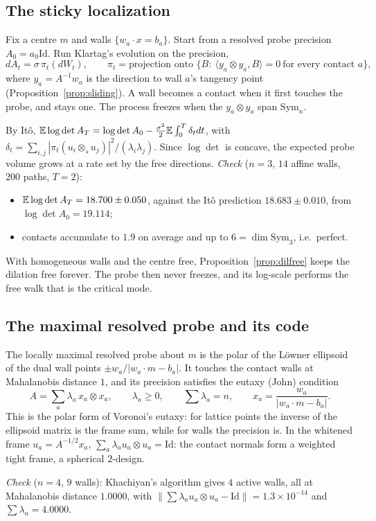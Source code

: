 \label{sec:process}
\subsection{The sticky localization}
\begin{definition}
Fix a centre $m$ and walls $\{w_a\cdot x=b_a\}$. Start from a resolved probe precision $A_0=a_0\mathrm{Id}$. Run Klartag's evolution on the precision,
\[
dA_t=\sigma\,\pi_t(dW_t),\qquad \pi_t=\text{projection onto }\{B:\ \langle y_a\otimes y_a,B\rangle=0\ \text{for every contact }a\},
\]
where $y_a=A^{-1}w_a$ is the direction to wall $a$'s tangency point (Proposition~\ref{prop:sliding}). A wall becomes a contact when it first
touches the probe, and stays one. The process freezes when the $y_a\otimes y_a$ span $\mathrm{Sym}_n$.
\end{definition}
By It\^o, $\mathbb E\log\det A_T=\log\det A_0-\frac{\sigma^2}2\mathbb E\int_0^T\delta_tdt$, with $\delta_t=\sum_{i,j}|\pi_t(u_i\otimes_su_j)|^2/(\lambda_i\lambda_j)$. Since $\log\det$ is
concave, the expected probe volume grows at a rate set by the free directions.
\emph{Check} ($n=3$, $14$ affine walls, $200$ paths, $T=2$):
\begin{itemize}[leftmargin=*]
\item $\mathbb E\log\det A_T=18.700\pm0.050$, against the It\^o prediction $18.683\pm0.010$, from $\log\det A_0=19.114$;
\item contacts accumulate to $1.9$ on average and up to $6=\dim\mathrm{Sym}_3$, i.e.\ perfect.
\end{itemize}
With homogeneous walls and the centre free, Proposition~\ref{prop:dilfree} keeps the dilation free forever. The probe then never
freezes, and its log-scale performs the free walk that is the critical mode.

\subsection{The maximal resolved probe and its code}
\begin{proposition}\label{prop:john}
The locally maximal resolved probe about $m$ is the polar of the L\"owner ellipsoid of the dual wall points $\pm w_a/|w_a\cdot m-b_a|$. It touches
the contact walls at Mahalanobis distance $1$, and its precision satisfies the eutaxy (John) condition
\[
A=\sum_a\lambda_a\,x_a\otimes x_a,\qquad \lambda_a\ge0,\qquad \sum\lambda_a=n,\qquad x_a=\frac{w_a}{|w_a\cdot m-b_a|}.
\]
This is the polar form of Voronoi's eutaxy: for lattice points the inverse of the ellipsoid matrix is the frame sum, while for walls the
precision is. In the whitened frame $u_a=A^{-1/2}x_a$, $\sum_a\lambda_au_a\otimes u_a=\mathrm{Id}$: the contact normals form a weighted tight frame, a
spherical $2$-design.
\end{proposition}
\emph{Check} ($n=4$, $9$ walls): Khachiyan's algorithm gives $4$ active walls, all at Mahalanobis distance $1.0000$, with
$\|\sum\lambda_au_a\otimes u_a-\mathrm{Id}\|=1.3\times10^{-14}$ and $\sum\lambda_a=4.0000$.

